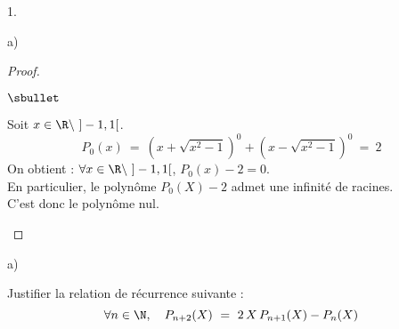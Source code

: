\documentclass[11pt]{article}%
\begin{document}
\begin{exerciceAP}
\begin{noliste}{1.}
\begin{noliste}{a)}
\begin{proof}
\begin{noliste}{$\sbullet$}
        \item Soit $x \in \R \setminus \ ]-1,1[$.
            \[
              P_0(x) \ = \ \left(x + \sqrt{x^2-1} \right)^0 + \left(x
                - \sqrt{x^2-1} \right)^0 \ = \ 2
            \]
            On obtient : $\forall x \in \R \setminus \ ]-1,1[$,
            $P_0(x)-2 = 0$.\\
            En particulier, le polynôme $P_0(X)-2$ admet une infinité
            de racines.\\
            C'est donc le polynôme nul.
          ~\\[-1.4cm]
        \end{noliste}
      \end{proof}
    \end{noliste}
    
  \item
    \begin{noliste}{a)}
    \item Justifier la relation de récurrence suivante :
      \[
        \forall n \in \N, \quad P_{n+2}(X) \ = \ 2 \, X \, P_{n+1}(X) -
        P_n(X)
      \]


\end{noliste}
\end{noliste}
\end{exerciceAP}
\end{document}
